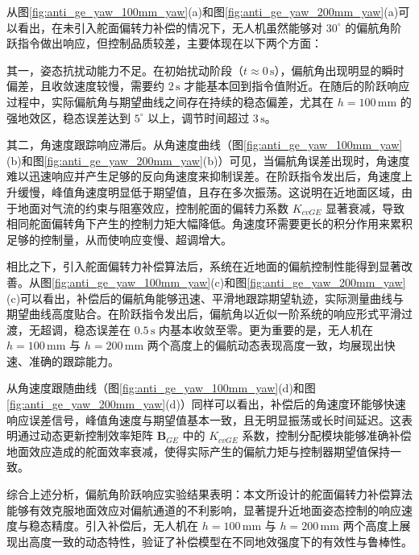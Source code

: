 从图\ref{fig:anti_ge_yaw_100mm_yaw}(a)和图\ref{fig:anti_ge_yaw_200mm_yaw}(a)可以看出，在未引入舵面偏转力补偿的情况下，无人机虽然能够对 \(30^\circ\) 的偏航角阶跃指令做出响应，但控制品质较差，主要体现在以下两个方面：

其一，姿态抗扰动能力不足。在初始扰动阶段（\(t \approx 0\,\mathrm{s}\)），偏航角出现明显的瞬时偏差，且收敛速度较慢，需要约 \(2\,\mathrm{s}\) 才能基本回到指令值附近。在随后的阶跃响应过程中，实际偏航角与期望曲线之间存在持续的稳态偏差，尤其在 \(h = 100\,\mathrm{mm}\) 的强地效区，稳态误差达到 \(5^\circ\) 以上，调节时间超过 \(3\,\mathrm{s}\)。

其二，角速度跟踪响应滞后。从角速度曲线（图\ref{fig:anti_ge_yaw_100mm_yaw}(b)和图\ref{fig:anti_ge_yaw_200mm_yaw}(b)）可见，当偏航角误差出现时，角速度难以迅速响应并产生足够的反向角速度来抑制误差。在阶跃指令发出后，角速度上升缓慢，峰值角速度明显低于期望值，且存在多次振荡。这说明在近地面区域，由于地面对气流的约束与阻塞效应，控制舵面的偏转力系数 \(K_{cvGE}\) 显著衰减，导致相同舵面偏转角下产生的控制力矩大幅降低。角速度环需要更长的积分作用来累积足够的控制量，从而使响应变慢、超调增大。

相比之下，引入舵面偏转力补偿算法后，系统在近地面的偏航控制性能得到显著改善。从图\ref{fig:anti_ge_yaw_100mm_yaw}(c)和图\ref{fig:anti_ge_yaw_200mm_yaw}(c)可以看出，补偿后的偏航角能够迅速、平滑地跟踪期望轨迹，实际测量曲线与期望曲线高度贴合。在阶跃指令发出后，偏航角以近似一阶系统的响应形式平滑过渡，无超调，稳态误差在 \(0.5\,\mathrm{s}\) 内基本收敛至零。更为重要的是，无人机在 \(h = 100\,\mathrm{mm}\) 与 \(h = 200\,\mathrm{mm}\) 两个高度上的偏航动态表现高度一致，均展现出快速、准确的跟踪能力。

从角速度跟随曲线（图\ref{fig:anti_ge_yaw_100mm_yaw}(d)和图\ref{fig:anti_ge_yaw_200mm_yaw}(d)）同样可以看出，补偿后的角速度环能够快速响应误差信号，峰值角速度与期望值基本一致，且无明显振荡或长时间延迟。这表明通过动态更新控制效率矩阵 \(\boldsymbol{B}_{GE}\) 中的 \(K_{cvGE}\) 系数，控制分配模块能够准确补偿地面效应造成的舵面效率衰减，使得实际产生的偏航力矩与控制器期望值保持一致。

综合上述分析，偏航角阶跃响应实验结果表明：本文所设计的舵面偏转力补偿算法能够有效克服地面效应对偏航通道的不利影响，显著提升近地面姿态控制的响应速度与稳态精度。引入补偿后，无人机在 \(h = 100\,\mathrm{mm}\) 与 \(h = 200\,\mathrm{mm}\) 两个高度上展现出高度一致的动态特性，验证了补偿模型在不同地效强度下的有效性与鲁棒性。

